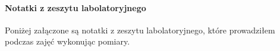 \documentclass[14pt, table]{extarticle}
\begin{document}
\begin{figure}[H]
    \centering
    \qquad
\end{figure}



\newpage
\paragraph{Notatki z zeszytu labolatoryjnego \\}
Poniżej załączone są notatki z zeszytu labolatoryjnego, które prowadziłem podczas zajęć wykonując pomiary.
\end{document}
